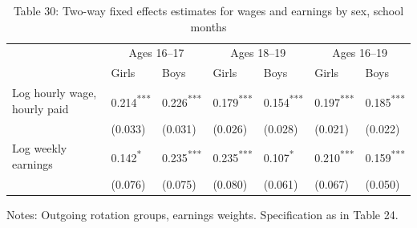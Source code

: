 \documentclass[12pt]{article}
\begin{document}
\begin{table}
\centering
\caption{Table 30: Two-way fixed effects estimates for wages and earnings by sex, school months}

\small
\begin{tabular}{p{}p{}p{}p{}p{}p{}p{}}
\toprule
 & \multicolumn{2}{c}{Ages 16--17} & \multicolumn{2}{c}{Ages 18--19} & \multicolumn{2}{c}{Ages 16--19} \\

 & Girls & Boys & Girls & Boys & Girls & Boys \\
\midrule
Log hourly wage, hourly paid & 0.214\textsuperscript{***} & 0.226\textsuperscript{***} & 0.179\textsuperscript{***} & 0.154\textsuperscript{***} & 0.197\textsuperscript{***} & 0.185\textsuperscript{***} \\
 & (0.033) & (0.031) & (0.026) & (0.028) & (0.021) & (0.022) \\
Log weekly earnings & 0.142\textsuperscript{*} & 0.235\textsuperscript{***} & 0.235\textsuperscript{***} & 0.107\textsuperscript{*} & 0.210\textsuperscript{***} & 0.159\textsuperscript{***} \\
 & (0.076) & (0.075) & (0.080) & (0.061) & (0.067) & (0.050) \\
\bottomrule
\end{tabular}



\noindent\small Notes: Outgoing rotation groups, earnings weights. Specification as in Table 24.

\end{table}
\end{document}

